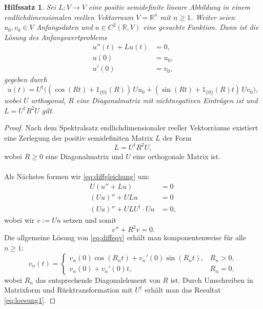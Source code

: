\documentclass[11pt,a4paper,leqno]{report}
\newtheorem{lemma}[theorem]{Hilfssatz}
\numberwithin{equation}{chapter}
\begin{document}
\begin{lemma}\label{lem:loesung_anfangswert}
	Sei \( L : V \to V \) eine positiv semidefinite lineare Abbildung in einem endlichdimensionalen reellen Vektorraum \( V = \mathbb{R}^n \) mit \( n \geq 1 \). Weiter seien \( u_0, v_0 \in V \) Anfangsdaten und \( u \in C^2(\mathbb{R}, V) \) eine gesuchte Funktion.  
	Dann ist die Lösung des Anfangswertproblems
	\begin{align}
		u''(t) + L u(t) &= 0, \label{eq:diffgleichung}\\
		u(0) &= u_0, \label{eq:anfangswert1}\\
		u'(0) &= v_0, \label{eq:anfangswert2}
	\end{align}
	gegeben durch
	\begin{equation}
		u(t) = U^\dagger \bigl( (\cos(R t) + 1_{\{0\}}(R))\, U u_0 + (\sin(R t) + 1_{\{0\}}(R) t) \, U v_0 \bigr),\label{eq:loesung1}
	\end{equation}
	wobei \(U\) orthogonal, \(R\) eine Diagonalmatrix mit nichtnegativen Einträgen ist und \( L = U^\dagger R^2 U \) gilt.
\end{lemma}
\begin{proof}
	Nach dem Spektralsatz endlichdimensionaler reeller Vektorräume existiert eine Zerlegung der positiv semidefiniten Matrix \(L\) der Form
	\[
	L = U^\dagger R^2 U,
	\]
	wobei \( R \geq 0 \) eine Diagonalmatrix und \( U \) eine orthogonale Matrix ist.\\
	\\
	Als Nächstes formen wir \eqref{eq:diffgleichung} um:
	\begin{align*}
		U (u'' + L u) &= 0 \\
		(U u)'' + U L u &= 0 \\
		(U u)'' + U L U^\dagger \cdot U u &= 0,
	\end{align*}
	wobei wir \( v := U u \) setzen und somit
	\begin{equation}
		v'' + R^2 v = 0.\label{eq:diffeqv}
	\end{equation}
	Die allgemeine Lösung von \eqref{eq:diffeqv} erhält man komponentenweise für alle \(n \geq 1\):
	\[
	v_n(t) = 
	\begin{cases}
		v_n(0) \cos(R_n t) + v_n'(0) \sin(R_n t), & R_n > 0, \\
		v_n(0) + v_n'(0) t, & R_n = 0,
	\end{cases}
	\]
	wobei \(R_n\) das entsprechende Diagonalelement von \(R\) ist. Durch Umschreiben in Matrixform und Rücktransformation mit \( U^\dagger \) erhält man das Resultat \eqref{eq:loesung1}.
\end{proof}
\end{document}
